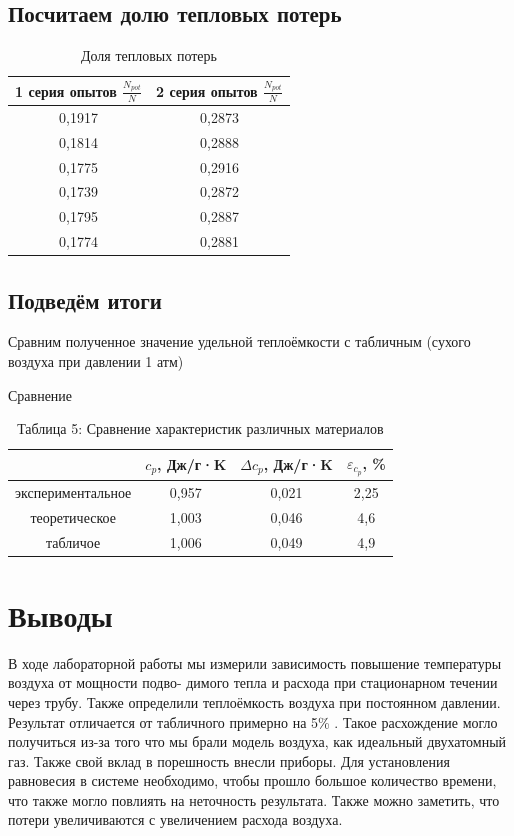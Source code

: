 \documentclass[a4paper,12pt]{article}
\begin{document}
        \subsection{Посчитаем долю тепловых потерь}

        \begin{table}[H]
        \centering
        \caption{Доля тепловых потерь}
        \begin{tabular}{|c|c|}
        \hline
         1 серия опытов $\frac{N_{pot}}{N}$   & 2 серия опытов $\frac{N_{pot}}{N}$ \\ \hline
            0,1917            & 0,2873 \\ \hline
        0,1814     & 0,2888 \\ \hline
        0,1775     & 0,2916 \\ \hline 
        0,1739       & 0,2872 \\ \hline
        0,1795 & 0,2887 \\ \hline
        0,1774       & 0,2881 \\ \hline
        \end{tabular}
    \end{table}

    \subsection{Подведём итоги}

    Сравним полученное значение удельной теплоёмкости с табличным (сухого воздуха при давлении 1 атм)

    \begin{table}[H]
    \centering
    \caption{Сравнение}
    \begin{tabular}{|c|c|c|c|}
        \hline
                  & $c_p$, Дж/г·K & $\Delta c_p$, Дж/г·K & $\varepsilon_{c_p}$, \% \\
        \hline
        экспериментальное & 0,957 & 0,021 & 2,25 \\
        \hline
        теоретическое    & 1,003 & 0,046 & 4,6 \\
        \hline
        табличое          & 1,006 & 0,049 & 4,9 \\
        \hline
    \end{tabular}
    \caption{Таблица 5: Сравнение характеристик различных материалов}
\end{table}


    \section{Выводы}
    В ходе лабораторной работы мы измерили зависимость повышение температуры воздуха от мощности подво-
димого тепла и расхода при стационарном течении через трубу. Также определили теплоёмкость воздуха при постоянном давлении.
Результат отличается от табличного примерно на 5\% . Такое расхождение могло получиться из-за того что мы брали модель воздуха, как идеальный двухатомный газ. Также свой вклад в порешность внесли приборы. Для установления равновесия в системе необходимо, чтобы прошло большое количество времени, что также могло повлиять на неточность результата. Также можно заметить, что потери увеличиваются с увеличением расхода воздуха.
\end{document}

